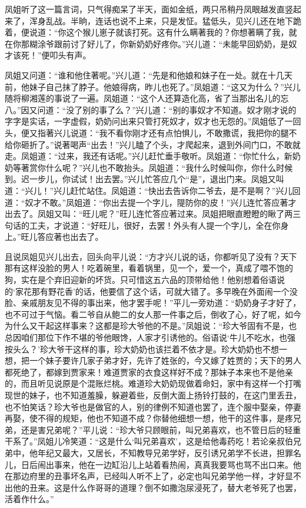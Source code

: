 \begin{parag}
    凤姐听了这一篇言词，只气得痴呆了半天，面如金纸，两只吊稍丹凤眼越发直竖起来了，浑身乱战。半晌，连话也说不上来，只是发怔。猛低头，见兴儿还在地下跪着，便说道：“你这个猴儿崽子就该打死。这有什么瞒著我的？你想著瞒了我，就在你那糊涂爷跟前讨了好儿了，你新奶奶好疼你。”兴儿道：“未能早回奶奶，是奴才该死！”便叩头有声。
\end{parag}


\begin{parag}
    凤姐又问道：“谁和他住著呢。”兴儿道：“先是和他娘和妹子在一处。就在十几天前，他妹子自己抹了脖子。他娘得病，昨儿也死了。”凤姐道：“这又为什么？”兴儿随将柳湘莲的事说了一遍。凤姐道：“这个人还算造化高，省了当那出名儿的忘八。”因又问道：“没了别的事了么？”兴儿道：“别的事奴才不知道。奴才刚才说的字字是实话，一字虚假，奶奶问出来只管打死奴才，奴才也无怨的。”凤姐低了一回头，便又指著兴儿说道：“我不看你刚才还有点怕惧儿，不敢撒谎，我把你的腿不给你砸折了。”说著喝声“出去！”兴儿瞌了个头，才爬起来，退到外间门口，不敢就走。凤姐道：“过来，我还有话呢。”兴儿赶忙垂手敬听。凤姐道：“你忙什么，新奶奶等著赏你什么呢？”兴儿也不敢抬头。凤姐道：“我什么时候叫你，你什么时候到。迟一步儿，你试试！出去罢。”兴儿忙答应几个“是”，退出门来。凤姐又叫道：“兴儿！”兴儿赶忙站住。凤姐道：“快出去告诉你二爷去，是不是啊？”兴儿回道：“奴才不敢。”凤姐道：“你出去提一个字儿，隄防你的皮！”兴儿连忙答应著才出去了。凤姐又叫：“旺儿呢？”旺儿连忙答应著过来。凤姐把眼直瞪瞪的瞅了两三句话的工夫，才说道：“好旺儿，很好，去罢！外头有人提一个字儿，全在你身上。”旺儿答应著也出去了。
\end{parag}


\begin{parag}
    且说凤姐见兴儿出去，回头向平儿说：“方才兴儿说的话，你都听见了没有？天下那有这样没脸的男人！吃着碗里，看着锅里，见一个，爱一个，真成了喂不饱的狗，实在是个弃旧迎新的坏货。只可惜这五六品的顶带给他！他别想着俗语说的‘家花那有野花香’的话，他要信了这个话，可就大错了。多早晚在外面闹一个没脸、亲戚朋友见不得的事出来，他才罢手呢！”平儿一旁劝道：“奶奶身子才好了，也不可过于气恼。看二爷自从鲍二的女人那一件事之后，倒收了心，好了呢，如今为什么又干起这样事来？这都是珍大爷他的不是。”凤姐说：“珍大爷固有不是，也总因咱们那位下作不堪的爷他眼馋，人家才引诱他的。俗语说‘牛儿不吃水，也强按头么？’珍大爷干这样的事，珍大奶奶也该拦着不依才是。珍大奶奶也不想一想，把一个妹子要许几家子弟才好，先许了姓张的，今又嫁了姓贾的；天下的男人都死绝了，都嫁到贾家来！难道贾家的衣食这样好不成？那妹子本来也不是他亲的，而且听见说原是个混账烂桃。难道珍大奶奶现做着命妇，家中有这样一个打嘴现世的妹子，也不知道羞臊，躲避着些，反倒大面上扬铃打鼓的，在这门里丢丑，也不怕笑话？珍大爷也是做官的人，别的律例不知道也罢了，连个服中娶亲，停妻再娶，使不得的规矩，他也不知道不成？你替他细想一想，他干的这件事，是疼兄弟，还是害兄弟呢？”平儿说：“珍大爷只顾眼前，叫兄弟喜欢，也不管日后的轻重干系了。”凤姐儿冷笑道：“这是什么‘叫兄弟喜欢’，这是给他毒药吃！若论亲叔伯兄弟中，他年纪又最大，又居长，不知教导兄弟学好，反引诱兄弟学不长进，担罪名儿，日后闹出事来，他在一边缸沿儿上站着看热闹，真真我要骂也骂不出口来。他在那边府里的丑事坏名声，已经叫人听不上了，必定也叫兄弟学他一样，才好显不出他的丑来。这是什么作哥哥的道理？倒不如撒泡尿浸死了，替大老爷死了也罢，活着作什么。”
\end{parag}



